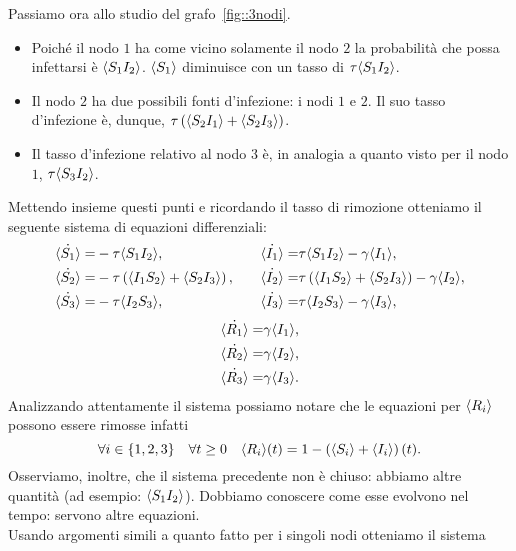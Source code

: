 Passiamo ora allo studio del grafo~\ref{fig::3nodi}.
\begin{itemize}
	

\item Poich\'e il nodo $1$ ha come vicino solamente il nodo $2$ la probabilit\`a che possa infettarsi \`e $\langle S_1 I_2 \rangle $. $\langle S_1 \rangle$ diminuisce con un tasso di $\tau \langle S_1 I_2 \rangle$.
\item Il nodo $2$ ha due possibili fonti d'infezione: i nodi $1$ e $2$. Il suo tasso d'infezione \`e, dunque,  $\tau \left(  \langle S_2I_1 \rangle + \langle S_2 I_3 \rangle \right)$.
\item Il tasso d'infezione relativo al nodo $3$ \`e,  
in analogia a quanto visto per il nodo $1$, $\tau\langle S_3I_2 \rangle$.
\end{itemize}
Mettendo insieme questi punti e ricordando il tasso di rimozione otteniamo il seguente sistema di equazioni differenziali:
\begin{equation*}
\begin{aligned}
	\dot{\langle S_1 \rangle} = & -\tau \langle  S_1 I_2 \rangle, 
\quad &
	\dot{\langle I_1 \rangle} = & \tau \langle S_1 I_2 \rangle-\gamma \langle I_1 \rangle, 
\\
	\dot{\langle S_2 \rangle} = & -\tau \left(  \langle  I_1 S_2 \rangle + \langle S_2I_3 \rangle \right),	
\quad & 
	\dot{\langle I_2 \rangle} = & \tau \left(  \langle  I_1 S_2 \rangle + \langle S_2I_3 \rangle \right)-\gamma \langle I_2 \rangle,
\\
	\dot{\langle S_3 \rangle} = & -\tau \langle  I_2 S_3 \rangle,
\quad & 
	\dot{\langle I_3 \rangle} = & \tau \langle  I_2 S_3 \rangle-\gamma \langle I_3 \rangle,
\end{aligned}
\end{equation*}
\begin{equation*} 
\begin{aligned}
	\dot{\langle R_1 \rangle} = & \gamma \langle  I_1 \rangle,\\
	\dot{\langle R_2 \rangle} = & \gamma \langle  I_2 \rangle,\\
 	\dot{\langle R_3 \rangle} = & \gamma \langle  I_3 \rangle.
 	\end{aligned}
\end{equation*}
Analizzando attentamente il sistema possiamo notare che le equazioni per $\langle R_i \rangle$ possono essere rimosse infatti 
$$ \forall i\in\{1, 2, 3\} \quad \forall t\geq 0 \quad \langle R_i \rangle(t) = 1 - \left( \langle S_i \rangle +\langle I_i \rangle \right)(t).$$
Osserviamo, inoltre, che il sistema precedente non \`e chiuso: abbiamo altre quantit\`a (ad esempio: $\langle S_1I_2 \rangle$). Dobbiamo conoscere come esse evolvono nel tempo: servono altre equazioni.\\
Usando argomenti simili a quanto fatto per i singoli nodi otteniamo  il sistema 
